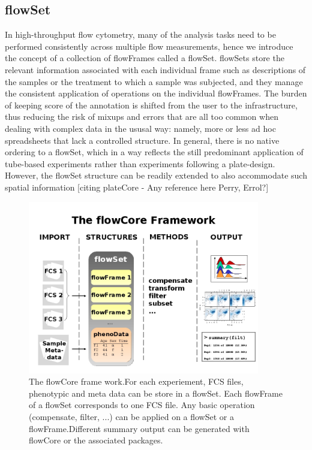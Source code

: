 \documentclass[12pt]{article}
\begin{document}
\subsection*{flowSet}
In high-throughput flow cytometry, many of the analysis tasks need to
be performed consistently across multiple flow measurements, hence we
introduce the concept of a collection of flowFrames called a
flowSet. flowSets store the relevant information associated with each
individual frame such as descriptions of the samples or the treatment
to which a sample was subjected, and they manage the consistent
application of operations on the individual flowFrames. The burden of
keeping score of the annotation is shifted from the user to the
infrastructure, thus reducing the risk of mixups and errors that are
all too common when dealing with complex data in the ususal way:
namely, more or less ad hoc spreadsheets that lack a controlled
structure. In general, there is no native ordering to a flowSet, which
in a way reflects the still predominant application of tube-based
experiments rather than experiments following a plate-design. However,
the flowSet structure can be readily extended to also accommodate such
spatial information [citing plateCore - Any reference here Perry, Errol?]

\begin{figure}
\centering
\includegraphics[width=0.9\textwidth]{Figure1-flowCoreFrameWork.jpg}
\caption{\label{fig1:FrameWork}{The flowCore frame work.For each experiement,
  FCS files, phenotypic and meta data can be store in a flowSet. Each
  flowFrame of a flowSet corresponds to one FCS file.  Any basic
  operation (compensate, filter, ...) can be applied on a flowSet or a
  flowFrame.Different summary output can be generated with flowCore or
  the associated packages.}}
\end{figure}
\end{document}
